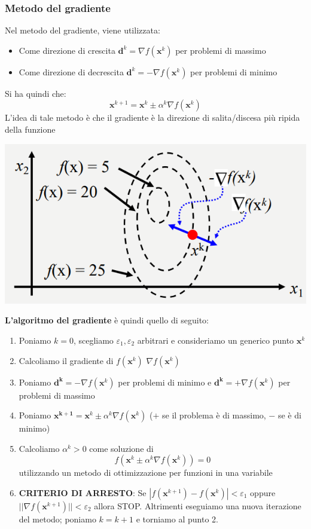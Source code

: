 \documentclass[12pt]{article}
\begin{document}
\subsubsection{Metodo del gradiente}
Nel metodo del gradiente, viene utilizzata:
\begin{itemize}
    \item Come direzione di crescita $\boldsymbol{d}^k = \nabla f(\boldsymbol{x}^k)$ per problemi di massimo
    \item Come direzione di decrescita $\boldsymbol{d}^k = - \nabla f(\boldsymbol{x}^k)$ per problemi di minimo
\end{itemize}
Si ha quindi che:
$$\boldsymbol{x}^{k+1} = \boldsymbol{x}^k \pm \alpha^k \nabla f(\boldsymbol{x}^k)$$
L'idea di tale metodo è che il gradiente è la direzione di salita/discesa più ripida della funzione
\begin{center}
    \includegraphics[width = 0.50\linewidth]{Images/102.PNG}
\end{center}
\textbf{L'algoritmo del gradiente} è quindi quello di seguito:
\begin{enumerate}
    \item Poniamo $k = 0$, scegliamo $\varepsilon_1,\varepsilon_2$ arbitrari e consideriamo un generico punto $\boldsymbol{x}^k$
    \item Calcoliamo il gradiente di $f(\boldsymbol{x}^k)$ $\nabla f(\boldsymbol{x}^k)$
    \item Poniamo $\boldsymbol{d^k} = -\nabla f(\boldsymbol{x}^k)$ per problemi di minimo e $\boldsymbol{d^k} = +\nabla f(\boldsymbol{x}^k)$ per problemi di massimo
    \item Poniamo $\boldsymbol{x^{k+1}} = \boldsymbol{x}^k \pm \alpha^k \nabla f(\boldsymbol{x}^k)$ ($+$ se il problema è di massimo, $-$ se è di minimo)
    \item Calcoliamo $\alpha^k >0$ come soluzione di $$f(\boldsymbol{x}^k \pm \alpha^k \nabla f(\boldsymbol{x}^k)) = 0$$ utilizzando un metodo di ottimizzazione per funzioni in una variabile
    \item \textbf{CRITERIO DI ARRESTO}: Se $\left | f(\boldsymbol{x}^{k+1}) - f(\boldsymbol{x}^k) \right | < \varepsilon_1$ oppure $||\nabla f(\boldsymbol{x}^{k+1})|| < \varepsilon_2$ allora STOP. Altrimenti eseguiamo una nuova iterazione del metodo; poniamo $k = k+1$ e torniamo al punto 2.
\end{enumerate}
\end{document}
